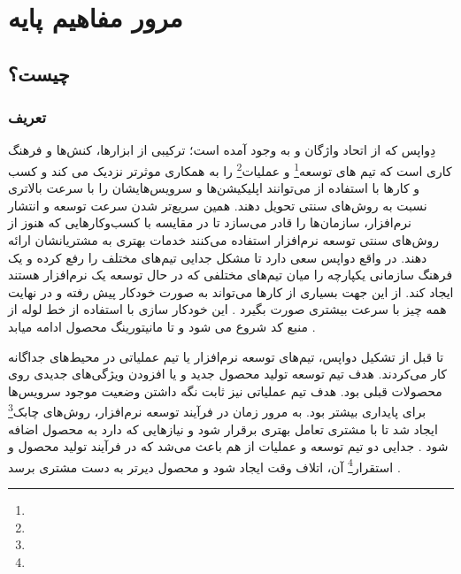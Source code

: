 \chapter{مرور مفاهیم پایه}

\section[مرو مفاهیم پایه]{ چیست؟}

\subsection{تعریف}
دِواپس که از اتحاد واژگان 
 و
به وجود آمده است؛ ترکیبی از ابزارها، کنش‌ها و فرهنگ کاری است که تیم های توسعه\footnote{} و عملیات\footnote{} را به همکاری موثرتر نزدیک می کند و کسب و کارها با استفاده از می‌توانند اپلیکیشن‌ها و سرویس‌هایشان را با سرعت بالاتری نسبت به روش‌های سنتی تحویل دهند. همین سریع‌تر شدن سرعت توسعه و انتشار نرم‌افزار، سازمان‌ها را قادر می‌سازد تا در مقایسه با کسب‌وکارهایی که هنوز از روش‌های سنتی توسعه نرم‌افزار استفاده می‌کنند خدمات بهتری به مشتریانشان ارائه دهند. در واقع دواپس سعی دارد تا مشکل جدایی تیم‌های مختلف را رفع کرده و یک فرهنگ سازمانی یکپارچه را میان تیم‌های مختلفی که در حال توسعه یک نرم‌افزار هستند ایجاد کند. از این جهت بسیاری از کارها می‌تواند به صورت خودکار پیش رفته و در نهایت همه چیز با سرعت بیشتری صورت بگیرد \cite{DevopsDef1,DevopsDef2}. این خودکار سازی با استفاده از خط لوله
از منبع کد شروع می شود و تا مانیتورینگ محصول ادامه میابد \cite{DevopsCICD1}.

تا قبل از تشکیل دواپس، تیم‌های توسعه نرم‌افزار یا تیم عملیاتی در محیط‌های جداگانه کار می‌کردند. هدف تیم توسعه تولید محصول جدید و یا افزودن ویژگی‌های جدیدی روی محصولات قبلی بود. هدف تیم عملیاتی نیز ثابت نگه داشتن وضعیت موجود سرویس‌ها برای پایداری بیشتر بود. به مرور زمان در فرآیند توسعه نرم‌افزار، روش‌های چابک\footnote{}
ایجاد شد تا با مشتری تعامل بهتری برقرار شود و نیازهایی که دارد به محصول اضافه شود \cite{DevopsAgile}. جدایی دو تیم توسعه و عملیات از هم باعث می‌شد که در فرآیند تولید محصول و استقرار\footnote{} آن، اتلاف وقت ایجاد شود و محصول دیرتر به دست مشتری برسد \cite{DevopsCD}.

